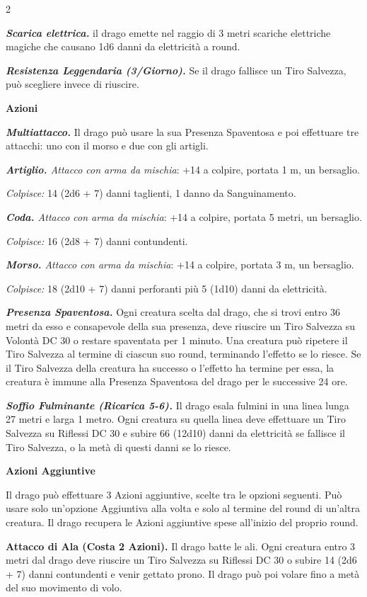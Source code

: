 \begin{multicols}{2}
{\emph{\textbf{Scarica elettrica.}} il drago emette nel raggio di 3 metri scariche elettriche magiche che causano 1d6 danni da elettricità a round.

\emph{\textbf{Resistenza Leggendaria (3/Giorno).}} Se il drago fallisce un Tiro Salvezza, può scegliere invece di riuscire.

\textbf{Azioni}

\emph{\textbf{Multiattacco.}} Il drago può usare la sua Presenza Spaventosa e poi effettuare tre attacchi: uno con il morso e due con gli artigli.

\emph{\textbf{Artiglio.} Attacco con arma da mischia}: +14 a colpire, portata 1 m, un bersaglio.

\emph{Colpisce:} 14 (2d6 + 7) danni taglienti, 1 danno da Sanguinamento.

\emph{\textbf{Coda.} Attacco con arma da mischia}: +14 a colpire, portata 5 metri, un bersaglio.

\emph{Colpisce:} 16 (2d8 + 7) danni contundenti.

\emph{\textbf{Morso.} Attacco con arma da mischia}: +14 a colpire, portata 3 m, un bersaglio.

\emph{Colpisce:} 18 (2d10 + 7) danni perforanti più 5 (1d10) danni da elettricità.

\emph{\textbf{Presenza Spaventosa.}} Ogni creatura scelta dal drago, che si trovi entro 36 metri da esso e consapevole della sua presenza, deve riuscire un Tiro Salvezza su Volontà DC 30 o restare spaventata per 1 minuto. Una creatura può ripetere il Tiro Salvezza al termine di ciascun suo round, terminando l'effetto se lo riesce. Se il Tiro Salvezza della creatura ha successo o l'effetto ha termine per essa, la creatura è immune alla Presenza Spaventosa del drago per le successive 24 ore.

\emph{\textbf{Soffio Fulminante (Ricarica 5-6).}} Il drago esala fulmini in una linea lunga 27 metri e larga 1 metro. Ogni creatura su quella linea deve effettuare un Tiro Salvezza su Riflessi DC 30 e subire 66 (12d10) danni da elettricità se fallisce il Tiro Salvezza, o la metà di questi danni se lo riesce.

\textbf{Azioni Aggiuntive}

Il drago può effettuare 3 Azioni aggiuntive, scelte tra le opzioni seguenti. Può usare solo un'opzione Aggiuntiva alla volta e solo al termine del round di un'altra creatura. Il drago recupera le Azioni aggiuntive spese all'inizio del proprio round.

\textbf{Attacco di Ala (Costa 2 Azioni).} Il drago batte le ali. Ogni creatura entro 3 metri dal drago deve riuscire un Tiro Salvezza su Riflessi DC 30 o subire 14 (2d6 + 7) danni contundenti e venir gettato prono. Il drago può poi volare fino a metà del suo movimento di volo.

}
\end{multicols}

